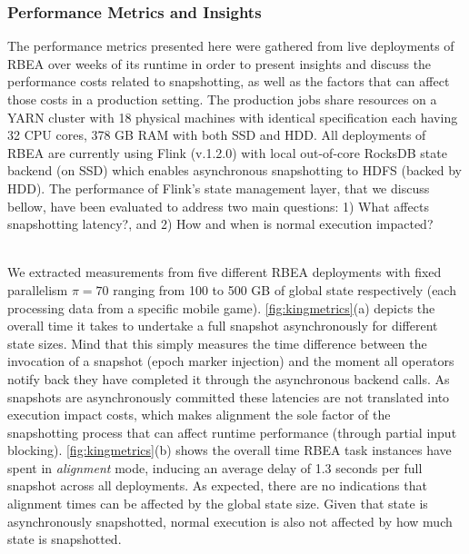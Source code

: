 \subsubsection{Performance Metrics and Insights} The performance metrics presented here were gathered from live deployments of RBEA over weeks of its runtime in order to present insights and discuss the performance costs related to snapshotting, as well as the factors that can affect those costs in a production setting. The production jobs share resources on a YARN cluster with 18 physical machines with identical specification each having 32 CPU cores, 378 GB RAM with both SSD and HDD. All deployments of RBEA are currently using Flink (v.1.2.0) with local out-of-core RocksDB state backend (on SSD) which enables asynchronous snapshotting to HDFS (backed by HDD). The performance of Flink's state management layer, that we discuss bellow,  have been evaluated to address two main questions: 1) What affects  snapshotting latency?, and 2) How and when is normal execution impacted?
\vspace*{-1mm}

 \\
We extracted measurements from five different RBEA deployments with fixed parallelism $\pi = 70$ ranging from 100 to 500 GB of global state respectively (each processing data from a specific mobile game). \autoref{fig:kingmetrics}(a) depicts the overall time it takes to undertake a full snapshot asynchronously for different state sizes. Mind that this simply measures the time difference between the invocation of a snapshot (epoch marker injection) and the moment all operators notify back they have completed it through the asynchronous backend calls. As snapshots are asynchronously committed these latencies are not translated into execution impact costs, which makes alignment the sole factor of the snapshotting process that can affect runtime performance (through partial input blocking). \autoref{fig:kingmetrics}(b) shows the overall time RBEA task instances have spent in \emph{alignment} mode, inducing an average delay of 1.3 seconds per full snapshot across all deployments. As expected, there are no indications that alignment times can be affected by the global state size. Given that state is asynchronously snapshotted, normal execution is also not affected by how much state is snapshotted.
\vspace*{-1mm}

